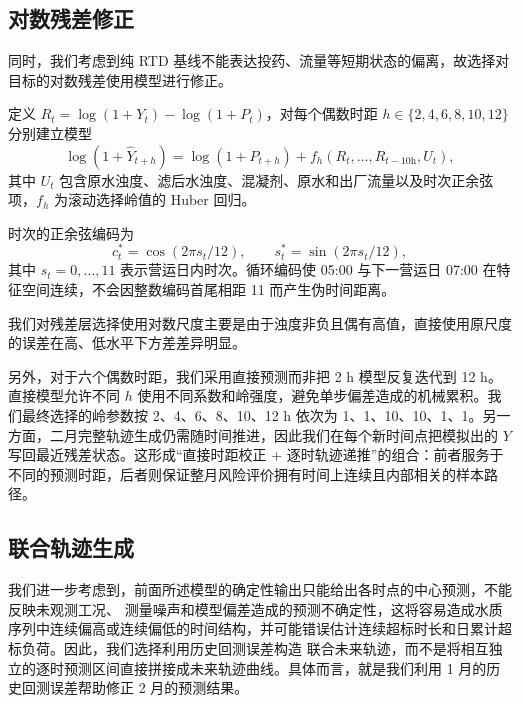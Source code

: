 \documentclass[UTF8,12pt,a4paper]{ctexart}
\begin{document}
\subsection{对数残差修正}

同时，我们考虑到纯 RTD 基线不能表达投药、流量等短期状态的偏离，故选择对目标的对数残差使用模型进行修正。

定义 $R_t=\log(1+Y_t)-\log(1+P_t)$，对每个偶数时距 $h\in\{2,4,6,8,10,12\}$ 分别建立模型
\begin{equation}
\log(1+\widehat Y_{t+h})=\log(1+P_{t+h})+f_h
\left(R_t,\ldots,R_{t-10\mathrm{h}},U_t\right),
\label{eq:hybrid}
\end{equation}
其中 $U_t$ 包含原水浊度、滤后水浊度、混凝剂、原水和出厂流量以及时次正余弦项，$f_h$ 为滚动选择岭值的 Huber 回归。

时次的正余弦编码为
\begin{equation}
c_t^{\ast}=\cos\left(2\pi s_t/12\right),\qquad
s_t^{\ast}=\sin\left(2\pi s_t/12\right),
\end{equation}
其中 $s_t=0,\ldots,11$ 表示营运日内时次。循环编码使 05:00 与下一营运日 07:00 在特征空间连续，不会因整数编码首尾相距 11 而产生伪时间距离。

我们对残差层选择使用对数尺度主要是由于浊度非负且偶有高值，直接使用原尺度的误差在高、低水平下方差差异明显。

另外，对于六个偶数时距，我们采用直接预测而非把 2 h 模型反复迭代到 12 h。直接模型允许不同 $h$ 使用不同系数和岭强度，避免单步偏差造成的机械累积。我们最终选择的岭参数按 2、4、6、8、10、12 h 依次为 1、1、10、10、1、1。另一方面，二月完整轨迹生成仍需随时间推进，因此我们在每个新时间点把模拟出的 $Y$ 写回最近残差状态。这形成“直接时距校正 + 逐时轨迹递推”的组合：前者服务于不同的预测时距，后者则保证整月风险评价拥有时间上连续且内部相关的样本路径。

\subsection{联合轨迹生成}

我们进一步考虑到，前面所述模型的确定性输出只能给出各时点的中心预测，不能反映未观测工况、
测量噪声和模型偏差造成的预测不确定性，这将容易造成水质序列中连续偏高或连续偏低的时间结构，并可能错误估计连续超标时长和日累计超标负荷。因此，我们选择利用历史回测误差构造
联合未来轨迹，而不是将相互独立的逐时预测区间直接拼接成未来轨迹曲线。具体而言，就是我们利用 1 月的历史回测误差帮助修正 2 月的预测结果。
\end{document}
